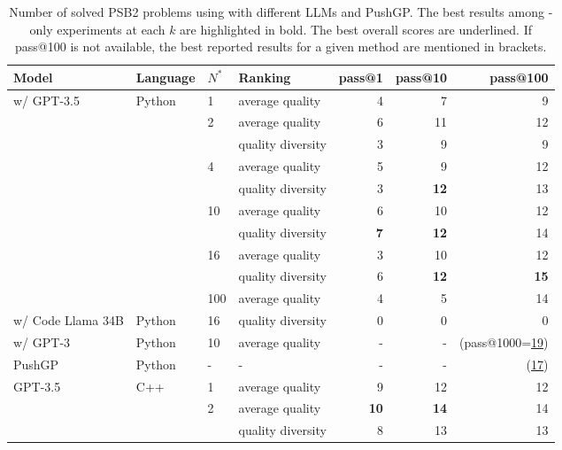 \begin{table}
    \centering
    \caption{Number of solved PSB2 problems using \method{} with different LLMs and PushGP. The best results among \method{}-only experiments at each $k$ are highlighted in bold. The best overall scores are underlined. If pass@100 is not available, the best reported results for a given method are mentioned in brackets.}\small
    \label{tab:generalisability-psb2}\vspace*{-4mm}
\begin{tabular}{llllrrr}
\toprule
Model & Language & $N^*$ & Ranking &  pass@1 &  pass@10 &  pass@100 \\
\midrule
 \method{} w/ GPT-3.5 & Python & 1   & average quality &       4 &        7 &         9 \\
&       & 2   & average quality &       6 &       11 &        12 \\
 &      &     & quality diversity  &       3 &        9 &         9 \\
 &      & 4   & average quality &       5 &        9 &        12 \\
&       &     & quality diversity  &       3 &       \textbf{12} &        13 \\
 &      & 10  & average quality &       6 &       10 &        12 \\
 &      &     & quality diversity  &       \textbf{7} &       \textbf{12} &        14 \\
 &      & 16  & average quality &       3 &       10 &        12 \\
 &      &     & quality diversity  &       6 &       \textbf{12} &        \textbf{15} \\
 &      & 100 & average quality &       4 &        5 &        14 \\
 \midrule
\method{} w/ Code Llama 34B & Python &  16  & quality diversity &    0 &        0 &         0 \\
 \method{} w/ GPT-3 & Python  & 10 & average quality &       - &        - &      (pass@1000=\underline{19}) \\
  \midrule
 PushGP & Python &  -   &    -            &       - &        - &      (\underline{17})\\
\midrule
\method{} GPT-3.5 & C++ & 1   & average quality &       9 &       12 &        12 \\
  &     & 2   & average quality &      \textbf{10} &       \textbf{14} &        14 \\
  &     &     & quality diversity  &       8 &       13 &        13 \\

\end{tabular}
\end{table}

